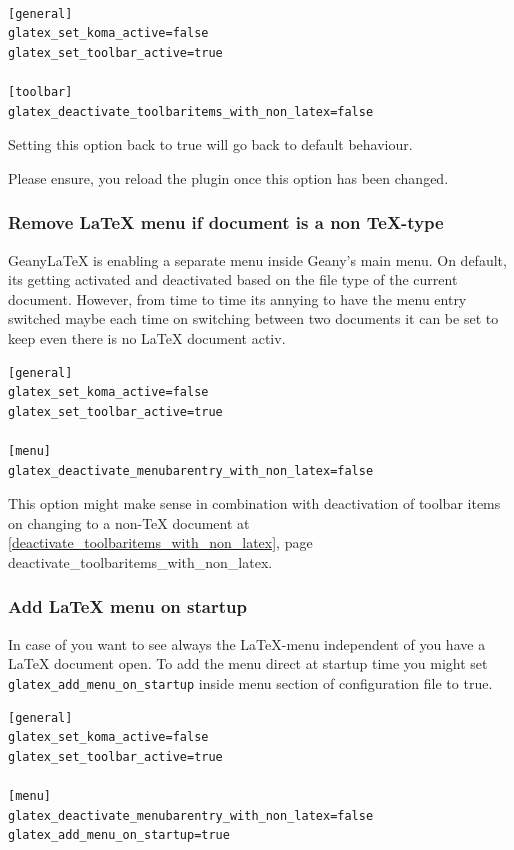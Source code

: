 \documentclass[%
paper=a4,%
fontsize=11pt,%
twoside=false,%
DIV18,%
headsepline,%
plainheadsepline,%
footsepline,%
plainfootsepline,%
bibliography=totoc,%
listof=totoc,%
BCOR10mm,%
parskip=half,%
openany,%
]{scrartcl}
\begin{document}
\begin{lstlisting}[caption={Configuration to enable toolbar buttons if %
						    no \LaTeX{} is active}]

[general]
glatex_set_koma_active=false
glatex_set_toolbar_active=true

[toolbar]
glatex_deactivate_toolbaritems_with_non_latex=false
\end{lstlisting}

Setting this option back to true will go back to default behaviour.

Please ensure, you reload the plugin once this option has been changed.

\subsubsection{Remove \LaTeX{} menu if document is a non \TeX-type}
\label{deactivate_menubarentry_with_non_latex}
Geany\LaTeX{} is enabling a separate menu inside Geany's main menu.
On default, its getting activated and deactivated based on the file
type of the current document. However, from time to time its annying
to have the menu entry switched maybe each time on switching between
two documents it can be set to keep even there is no LaTeX document
activ.

\begin{lstlisting}[caption={Configuration to keep \LaTeX{} menu inside menubar}]
[general]
glatex_set_koma_active=false
glatex_set_toolbar_active=true

[menu]
glatex_deactivate_menubarentry_with_non_latex=false
\end{lstlisting}

This option might make sense in combination with deactivation of
toolbar items on changing to a non-\TeX{} document at
\ref{deactivate_toolbaritems_with_non_latex}, page \pageref
{deactivate_toolbaritems_with_non_latex}.

\subsubsection{Add \LaTeX{} menu on startup}

In case of you want to see always the \LaTeX{}-menu independent of
you have a \LaTeX{} document open. To add the menu direct at startup
time you might set \texttt{glatex\_add\_menu\_on\_startup} inside
menu section of configuration file to true.

\begin{lstlisting}[caption={Configuration add \LaTeX{} menu on startup of Geany}]
[general]
glatex_set_koma_active=false
glatex_set_toolbar_active=true

[menu]
glatex_deactivate_menubarentry_with_non_latex=false
glatex_add_menu_on_startup=true
\end{lstlisting}
\end{document}
